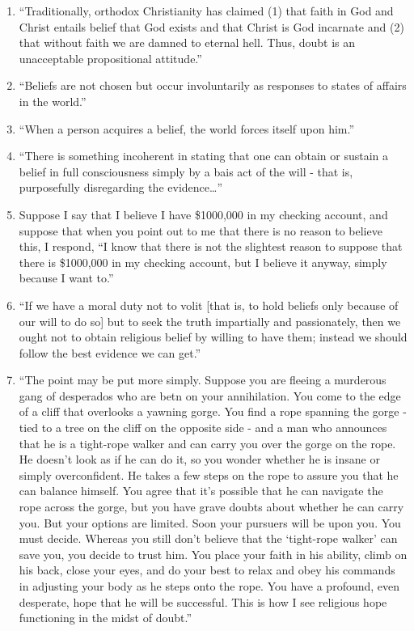 \documentclass[
]{book}
\providecommand{\tightlist}{%
  \setlength{\itemsep}{0pt}\setlength{\parskip}{0pt}}
\begin{document}
\begin{enumerate}
\def\labelenumi{\arabic{enumi}.}
\tightlist
\item
  ``Traditionally, orthodox Christianity has claimed (1) that faith in God and Christ entails belief that God exists and that Christ is God incarnate and (2) that without faith we are damned to eternal hell. Thus, doubt is an unacceptable propositional attitude.''
\item
  ``Beliefs are not chosen but occur involuntarily as responses to states of affairs in the world.''\\
\item
  ``When a person acquires a belief, the world forces itself upon him.''\\
\item
  ``There is something incoherent in stating that one can obtain or sustain a belief in full consciousness simply by a bais act of the will - that is, purposefully disregarding the evidence\ldots{}''\\
\item
  Suppose I say that I believe I have \$1000,000 in my checking account, and suppose that when you point out to me that there is no reason to believe this, I respond, ``I know that there is not the slightest reason to suppose that there is \$1000,000 in my checking account, but I believe it anyway, simply because I want to.''\\
\item
  ``If we have a moral duty not to volit {[}that is, to hold beliefs only because of our will to do so{]} but to seek the truth impartially and passionately, then we ought not to obtain religious belief by willing to have them; instead we should follow the best evidence we can get.''\\
\item
  ``The point may be put more simply. Suppose you are fleeing a murderous gang of desperados who are betn on your annihilation. You come to the edge of a cliff that overlooks a yawning gorge. You find a rope spanning the gorge - tied to a tree on the cliff on the opposite side - and a man who announces that he is a tight-rope walker and can carry you over the gorge on the rope. He doesn't look as if he can do it, so you wonder whether he is insane or simply overconfident. He takes a few steps on the rope to assure you that he can balance himself. You agree that it's possible that he can navigate the rope across the gorge, but you have grave doubts about whether he can carry you. But your options are limited. Soon your pursuers will be upon you. You must decide. Whereas you still don't believe that the `tight-rope walker' can save you, you decide to trust him. You place your faith in his ability, climb on his back, close your eyes, and do your best to relax and obey his commands in adjusting your body as he steps onto the rope. You have a profound, even desperate, hope that he will be successful. This is how I see religious hope functioning in the midst of doubt.''
\end{enumerate}
\end{document}
